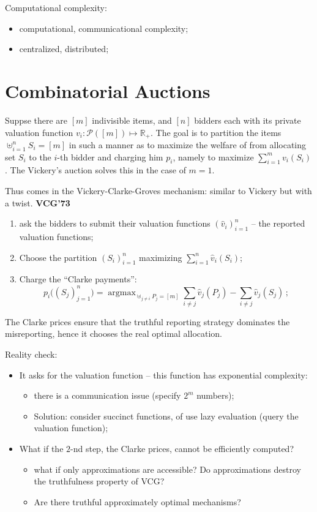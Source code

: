 \documentclass[a4paper]{article}
\newcommand{\Real}{\mathbb{R}}
\newcommand{\argmax}{\mathop{\text{argmax}}}
\begin{document}
Computational complexity: \begin{itemize}
	\item computational, communicational complexity;
	\item centralized, distributed;
\end{itemize}

\section{Combinatorial Auctions} %
\label{sec:combinatorial_auctions}

Suppse there are $[m]$ indivisible items, and $[n]$ bidders each with its private
valuation function $v_i:\mathcal{P}([m]) \mapsto \Real_+$. The goal is to partition
the items $\uplus_{i=1}^n S_i = [m]$ in such a manner as to maximize the welfare of
from allocating set $S_i$ to the $i$-th bidder and charging him $p_i$, namely to maximize
$\sum_{i=1}^m v_i(S_i)$. The Vickery's auction solves this in the case of $m=1$.

Thus comes in the Vickery-Clarke-Groves mechanism: similar to Vickery but with a twist.
\textbf{VCG'73}
\begin{enumerate}
	\item ask the bidders to submit their valuation functions $(\hat{v}_i)_{i=1}^n$
	-- the reported valuation functions;
	\item Choose the  partition $(S_i)_{i=1}^n$ maximizing $\sum_{i=1}^n \hat{v}_i(S_i)$;
	\item Charge the ``Clarke payments'':
	\begin{equation}
		p_i\bigl((S_j)_{j=1}^n\bigr)
			= \argmax_{\uplus_{j\neq i} P_j = [m]}
				\sum_{i\neq j} \hat{v}_j(P_j) - \sum_{i\neq j} \hat{v}_j(S_j) \,;
	\end{equation}
\end{enumerate}
The Clarke prices ensure that the truthful reporting strategy dominates the misreporting,
hence it chooses the real optimal allocation.

Reality check:\begin{itemize}
	\item It asks for the valuation function -- this function has exponential complexity:
	\begin{itemize}
		\item there is a communication issue (specify $2^m$ numbers);
		\item Solution: consider succinct functions, of use lazy evaluation (query the
		valuation function);
	\end{itemize}
	\item What if the $2$-nd step, the Clarke prices, cannot be efficiently computed?
	\begin{itemize}
		\item what if only approximations are accessible? Do approximations destroy
		the truthfulness property of VCG?
		\item Are there truthful approximately optimal mechanisms?
	\end{itemize}
\end{itemize}
\end{document}
